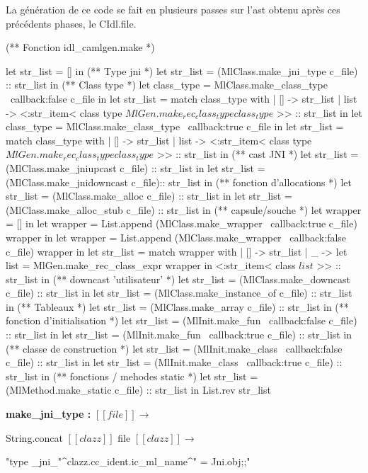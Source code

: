 \documentclass[a4paper, 11pt]{report}
\begin{document}
La génération de ce code se fait en plusieurs passes sur l'ast obtenu
après ces précédents phases, le CIdl.file.
\begin{OCaml}
(** Fonction idl_camlgen.make *)

  let str_list = [] in
  (** Type jni *)
  let str_list = (MlClass.make_jni_type c_file) :: str_list in
  (** Class type *)
  let class_type = MlClass.make_class_type ~callback:false c_file in
  let str_list = match class_type with 
  | [] -> str_list 
  | list -> <:str_item< class type $MlGen.make_rec_class_type class_type$ >> :: str_list in
  let class_type = MlClass.make_class_type ~callback:true c_file in
  let str_list = match class_type with 
  | [] -> str_list 
  | list -> <:str_item< class type $MlGen.make_rec_class_type class_type$ >> :: str_list in
  (** cast JNI *)
  let str_list = (MlClass.make_jniupcast c_file) :: str_list in
  let str_list = (MlClass.make_jnidowncast c_file):: str_list in 
  (** fonction d'allocations *)
  let str_list = (MlClass.make_alloc c_file) :: str_list in
  let str_list = (MlClass.make_alloc_stub c_file) :: str_list in
  (** capsule/souche *)
  let wrapper = [] in
  let wrapper = List.append (MlClass.make_wrapper ~callback:true c_file) wrapper in
  let wrapper = List.append (MlClass.make_wrapper ~callback:false c_file) wrapper in
  let str_list = match wrapper with 
    | [] -> str_list 
    | _ ->
        let list = MlGen.make_rec_class_expr wrapper in
        <:str_item< class $list$ >> :: str_list
  in
  (** downcast 'utilisateur' *)
  let str_list = (MlClass.make_downcast c_file) :: str_list in
  let str_list = (MlClass.make_instance_of c_file) :: str_list in
  (** Tableaux *)
  let str_list = (MlClass.make_array c_file) :: str_list in
  (** fonction d'initialisation *)
  let str_list = (MlInit.make_fun ~callback:false c_file) :: str_list in
  let str_list = (MlInit.make_fun ~callback:true c_file) :: str_list in
  (** classe de construction *)
  let str_list = (MlInit.make_class ~callback:false c_file) :: str_list in
  let str_list = (MlInit.make_class ~callback:true c_file) :: str_list in
  (** fonctions / mehodes static *)
  let str_list = (MlMethod.make_static c_file) :: str_list in
  List.rev str_list
\end{OCaml}

\textbf{make\_jni\_type :}
\newline
$[\![ file ]\!]$$\longrightarrow$

String.concat $[\![ clazz ]\!]$ file
\newline
$[\![ clazz ]\!]$$\longrightarrow$
\begin{OCaml}
"type _jni_"^clazz.cc_ident.ic_ml_name^" = Jni.obj;;"
\end{OCaml}
\end{document}
